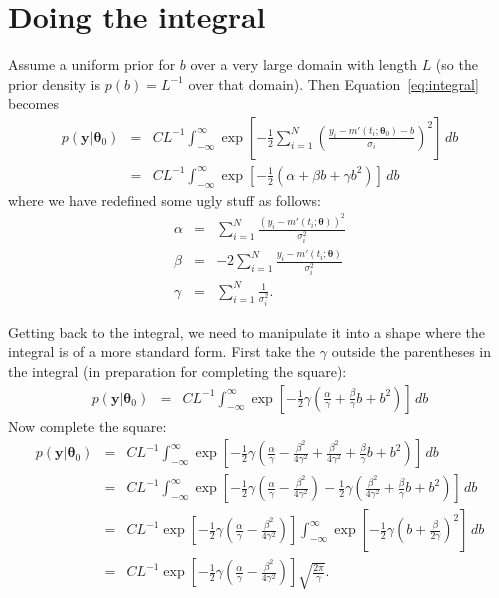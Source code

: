 \documentclass[a4paper, 11pt]{article}
\newcommand{\yy}{\boldsymbol{y}}	%
\newcommand{\btheta}{\boldsymbol{\theta}}  %
\begin{document}
\section{Doing the integral}
Assume a uniform prior for $b$ over a very large domain with length
$L$ (so the prior density is $p(b) = L^{-1}$ over that domain). Then
Equation~\ref{eq:integral} becomes
\begin{eqnarray}
p(\yy | \btheta_0) &=& CL^{-1}\int_{-\infty}^\infty
\exp\left[
-\frac{1}{2}\sum_{i=1}^N
\left(\frac{y_i - m'(t_i; \btheta_0) - b}{\sigma_i}
\right)^2
\right]
\, db \\
&=&
CL^{-1}\int_{-\infty}^\infty
\exp\left[
-\frac{1}{2}
\left(\alpha + \beta b + \gamma b^2\right)
\right]
\, db
\end{eqnarray}
where we have redefined some ugly stuff as follows:
\begin{eqnarray}
\alpha &=& \sum_{i=1}^N \frac{\left(y_i - m'(t_i; \btheta)\right)^2}{\sigma_i^2}\\
\beta  &=& -2\sum_{i=1}^N\frac{y_i - m'(t_i; \btheta)}{\sigma_i^2}\\
\gamma &=& \sum_{i=1}^N \frac{1}{\sigma_i^2}.
\end{eqnarray}

Getting back to the integral, we need to manipulate it into a shape where the
integral is of a more standard form.
First take the $\gamma$ outside the parentheses in the integral (in preparation
for completing the square):
\begin{eqnarray}
p(\yy | \btheta_0) &=&
CL^{-1}\int_{-\infty}^\infty
\exp\left[
-\frac{1}{2}\gamma
\left(\frac{\alpha}{\gamma} + \frac{\beta}{\gamma} b + b^2\right)
\right]
\, db
\end{eqnarray}
Now complete the square:
\begin{eqnarray}
p(\yy | \btheta_0) &=&
CL^{-1}\int_{-\infty}^\infty
\exp\left[
-\frac{1}{2}\gamma
\left(\frac{\alpha}{\gamma} - \frac{\beta^2}{4\gamma^2} + \frac{\beta^2}{4\gamma^2} + \frac{\beta}{\gamma} b + b^2\right)
\right]
\, db\\
&=&
CL^{-1}\int_{-\infty}^\infty
\exp\left[
-\frac{1}{2}\gamma
\left(\frac{\alpha}{\gamma} - \frac{\beta^2}{4\gamma^2}\right)
- \frac{1}{2}\gamma \left(\frac{\beta^2}{4\gamma^2} + \frac{\beta}{\gamma} b + b^2\right)
\right]
\, db\\
&=&
CL^{-1}\exp\left[
-\frac{1}{2}\gamma
\left(\frac{\alpha}{\gamma} - \frac{\beta^2}{4\gamma^2}\right)\right]
\int_{-\infty}^\infty
\exp\left[
- \frac{1}{2}\gamma \left(b + \frac{\beta}{2\gamma}\right)^2
\right]
\, db\\
&=&
CL^{-1}\exp\left[
-\frac{1}{2}\gamma
\left(\frac{\alpha}{\gamma} - \frac{\beta^2}{4\gamma^2}\right)\right]
\sqrt{\frac{2\pi}{\gamma}}.
\end{eqnarray}
\end{document}
